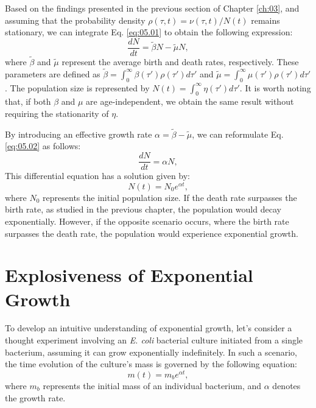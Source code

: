 Based on the findings presented in the previous section of Chapter \ref{ch:03}, and assuming that the probability density $\rho(\tau, t) = \nu(\tau, t) / N(t)$ remains stationary, we can integrate Eq. \eqref{eq:05.01} to obtain the following expression:
\begin{equation}
\frac{dN}{dt} = \widetilde{\beta} N - \widetilde{\mu} N,
\label{eq:05.02}
\end{equation}
where $\widetilde{\beta}$ and $\widetilde{\mu}$ represent the average birth and death rates, respectively. These parameters are defined as $\widetilde{\beta} = \int_0^\infty \beta(\tau') \rho(\tau') d\tau'$ and $\widetilde{\mu} = \int_0^\infty \mu(\tau') \rho(\tau') d\tau'$. The population size is represented by $N(t) = \int_0^\infty \eta(\tau') d\tau'$. It is worth noting that, if both $\beta$ and $\mu$ are age-independent, we obtain the same result without requiring the stationarity of $\eta$.

By introducing an effective growth rate $\alpha = \widetilde{\beta} - \widetilde{\mu}$, we can reformulate Eq. \eqref{eq:05.02} as follows:
\begin{equation}
\frac{dN}{dt} = \alpha N,
\label{eq:05.03}
\end{equation}
This differential equation has a solution given by:
\begin{equation}
N(t) = N_0 e^{\alpha t},
\label{eq:05.04}
\end{equation}
where $N_0$ represents the initial population size. If the death rate surpasses the birth rate, as studied in the previous chapter, the population would decay exponentially. However, if the opposite scenario occurs, where the birth rate surpasses the death rate, the population would experience exponential growth.

\section{Explosiveness of Exponential Growth}

To develop an intuitive understanding of exponential growth, let's consider a thought experiment involving an \textit{E. coli} bacterial culture initiated from a single bacterium, assuming it can grow exponentially indefinitely. In such a scenario, the time evolution of the culture's mass is governed by the following equation:
\begin{equation}
m(t) = m_b e^{\alpha t},
\label{eq:05.05}
\end{equation}
where $m_b$ represents the initial mass of an individual bacterium, and $\alpha$ denotes the growth rate.

